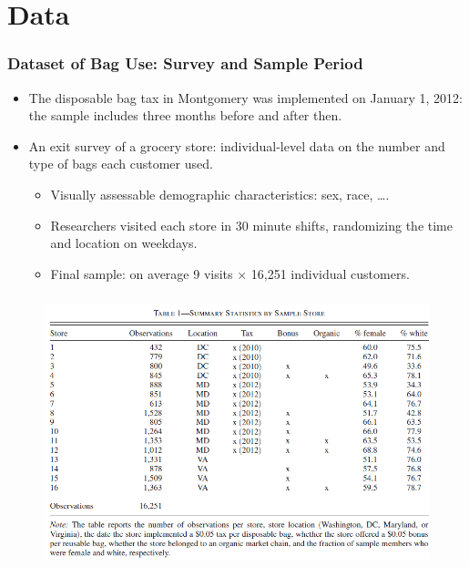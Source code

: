 \documentclass[dvipdfmx,11pt]{beamer}
\begin{document}
\section{Data}
\frame{\sectionpage}

\begin{frame}\frametitle{Dataset of Bag Use: Survey and Sample Period}
  \begin{itemize}
    \item The disposable bag tax in Montgomery was implemented on January 1, 2012: the sample includes three months before and after then.
    \item An exit survey of a grocery store: individual-level data on the number and type of bags each customer used.
    \begin{itemize}
      \item Visually assessable demographic characteristics: sex, race, \ldots.
      \item Researchers visited each store in 30 minute shifts, randomizing the time and location on weekdays.
      \item Final sample: on average 9 visits $\times$ 16,251 individual customers.
    \end{itemize}
  \end{itemize}
\end{frame}

\begin{frame}\frametitle{}
  \begin{figure}[ht]
    \centering
    \includegraphics[scale = .6]{0807tanji/T1}
  \end{figure}
\end{frame}
\end{document}
